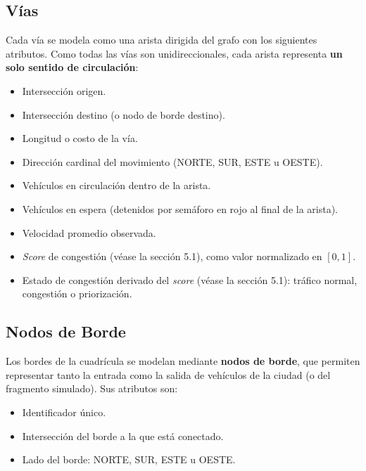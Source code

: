 \documentclass[12pt, a4paper]{article}
\begin{document}
\subsection{Vías}

Cada vía se modela como una arista dirigida del grafo con los siguientes atributos. Como todas las vías son unidireccionales, cada arista representa \textbf{un solo sentido de circulación}:

\begin{itemize}
    \item Intersección origen.
    \item Intersección destino (o nodo de borde destino).
    \item Longitud o costo de la vía.
    \item Dirección cardinal del movimiento (NORTE, SUR, ESTE u OESTE).
    \item Vehículos en circulación dentro de la arista.
    \item Vehículos en espera (detenidos por semáforo en rojo al final de la arista).
    \item Velocidad promedio observada.
    \item \textit{Score} de congestión (véase la sección 5.1), como valor normalizado en $[0, 1]$.
    \item Estado de congestión derivado del \textit{score} (véase la sección 5.1): tráfico normal, congestión o priorización.
\end{itemize}

\subsection{Nodos de Borde}

Los bordes de la cuadrícula se modelan mediante \textbf{nodos de borde}, que permiten representar tanto la entrada como la salida de vehículos de la ciudad (o del fragmento simulado). Sus atributos son:

\begin{itemize}
    \item Identificador único.
    \item Intersección del borde a la que está conectado.
    \item Lado del borde: NORTE, SUR, ESTE u OESTE.
\end{itemize}
\end{document}
